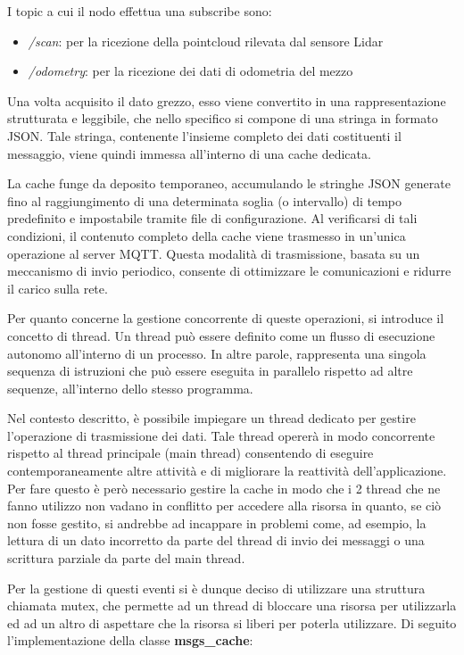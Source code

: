 \noindent I topic a cui il nodo effettua una subscribe sono:

\begin{itemize}
  \item \textit{/scan}: per la ricezione della pointcloud rilevata dal sensore Lidar
  \item \textit{/odometry}: per la ricezione dei dati di odometria del mezzo
\end{itemize}

\noindent Una volta acquisito il dato grezzo, esso viene convertito in una rappresentazione strutturata e leggibile, che nello specifico si compone di una stringa in formato JSON. Tale stringa, contenente l'insieme completo dei dati costituenti il messaggio, viene quindi immessa all'interno di una cache dedicata.

\noindent La cache funge da deposito temporaneo, accumulando le stringhe JSON generate fino al raggiungimento di una determinata soglia (o intervallo) di tempo predefinito e impostabile tramite file di configurazione. Al verificarsi di tali condizioni, il contenuto completo della cache viene trasmesso in un'unica operazione al server MQTT. Questa modalità di trasmissione, basata su un meccanismo di invio periodico, consente di ottimizzare le comunicazioni e ridurre il carico sulla rete.

\noindent Per quanto concerne la gestione concorrente di queste operazioni, si introduce il concetto di thread. Un thread può essere definito come un flusso di esecuzione autonomo all'interno di un processo. In altre parole, rappresenta una singola sequenza di istruzioni che può essere eseguita in parallelo rispetto ad altre sequenze, all'interno dello stesso programma.

\noindent Nel contesto descritto, è possibile impiegare un thread dedicato per gestire l'operazione di trasmissione dei dati. Tale thread opererà in modo concorrente rispetto al thread principale (main thread) consentendo di eseguire contemporaneamente altre attività e di migliorare la reattività dell'applicazione. Per fare questo è però necessario gestire la cache in modo che i 2 thread che ne fanno utilizzo non vadano in conflitto per accedere alla risorsa in quanto, se ciò non fosse gestito, si andrebbe ad incappare in problemi come, ad esempio, la lettura di un dato incorretto da parte del thread di invio dei messaggi o una scrittura parziale da parte del main thread.

\noindent Per la gestione di questi eventi si è dunque deciso di utilizzare una struttura chiamata mutex, che permette ad un thread di bloccare una risorsa per utilizzarla ed ad un altro di aspettare che la risorsa si liberi per poterla utilizzare. Di seguito l'implementazione della classe \textbf{msgs\_cache}:

